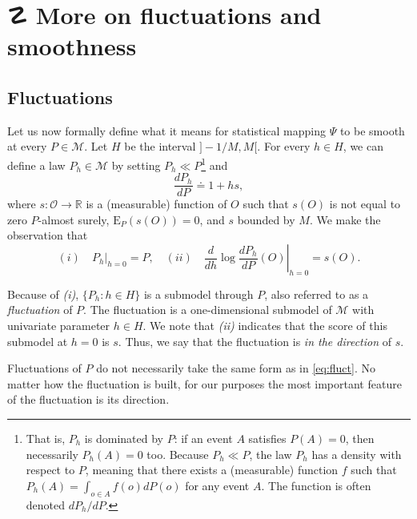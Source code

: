 \documentclass[
  11pt,
  openright,twoside]{book}
\DeclareRobustCommand{\stixdanger}{%
  {\usefont{U}{stixbbit}{m}{it}\symbol{"F6}}%
}
\newcommand{\bbR}{\mathbb{R}}
\newcommand{\defq}{\doteq}
\newcommand{\calM}{\mathcal{M}}
\newcommand{\calO}{\mathcal{O}}
\newcommand{\Exp}{\textrm{E}}
\theoremstyle{definition}
\theoremstyle{definition}
\theoremstyle{definition}
\theoremstyle{definition}
\theoremstyle{remark}
\begin{document}
\hypertarget{smooth-second-pass}{%
\section{\texorpdfstring{☡ \stixdanger{} More on fluctuations and smoothness}{☡  More on fluctuations and smoothness}}\label{smooth-second-pass}}

\hypertarget{smooth-second-pass-fluctuations}{%
\subsection{Fluctuations}\label{smooth-second-pass-fluctuations}}

Let us now formally define what it means for statistical mapping \(\Psi\) to be
smooth at every \(P \in \calM\). Let \(H\) be the interval \(]-1/M,M[\). For every
\(h \in H\), we can define a law \(P_{h} \in \calM\) by setting \(P_{h} \ll P\)\footnote{That is, \(P_{h}\) is dominated by \(P\): if an event \(A\) satisfies \(P(A) = 0\), then necessarily \(P_{h} (A) = 0\) too. Because \(P_{h} \ll P\), the law
  \(P_{h}\) has a density with respect to \(P\), meaning that there exists a
  (measurable) function \(f\) such that \(P_{h}(A) = \int_{o \in A} f(o) dP(o)\) for
  any event \(A\). The function is often denoted \(dP_{h}/dP\).} and
\begin{equation} \frac{dP_h}{dP} \defq 1 + h s, 
\label{eq:fluct} \end{equation}
where \(s : \calO\to \bbR\) is a (measurable) function of \(O\) such that \(s(O)\)
is not equal to zero \(P\)-almost surely, \(\Exp_{P} (s(O)) = 0\), and \(s\) bounded
by \(M\). We make the observation that
\begin{equation} (i) \quad P_h|_{h=0} =
P,\quad  (ii)  \quad \left.\frac{d}{dh}  \log  \frac{dP_h}{dP}(O)\right|_{h=0}
=s(O).  \label{eq:score} 
\end{equation}

Because of \emph{(i)}, \(\{P_{h} : h \in H\}\) is a submodel through \(P\), also
referred to as a \emph{fluctuation} of \(P\). The fluctuation is a one-dimensional
submodel of \(\calM\) with univariate parameter \(h \in H\). We note that \emph{(ii)}
indicates that the score of this submodel at \(h = 0\) is \(s\). Thus, we say
that the fluctuation is \emph{in the direction} of \(s\).

Fluctuations of \(P\) do not necessarily take the same form as in
\eqref{eq:fluct}. No matter how the fluctuation is built, for our purposes the
most important feature of the fluctuation is its direction.
\end{document}
